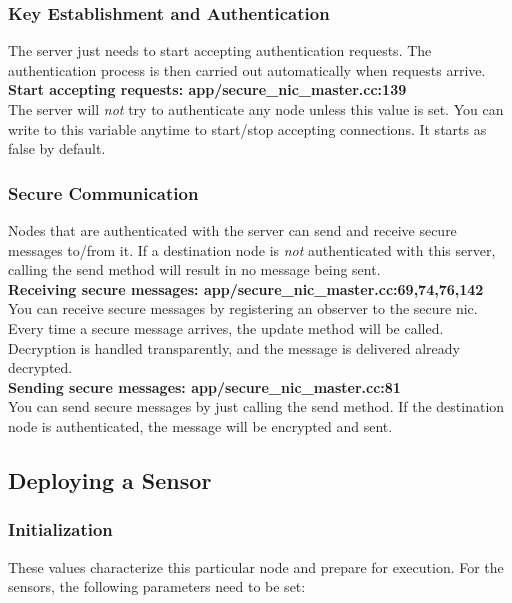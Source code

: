 \documentclass[a4paper,10pt]{article}   %
\begin{document}
	\subsubsection{Key Establishment and Authentication}
	The server just needs to start accepting authentication requests. The authentication process is then carried out automatically when requests arrive.\\

		\textbf{Start accepting requests: app/secure\_nic\_master.cc:139}\\
		\indent The server will \emph{not} try to authenticate any node unless this value is set. You can write to this variable anytime to start/stop accepting connections. It starts as false by default.\\

	\subsubsection{Secure Communication}
	Nodes that are authenticated with the server can send and receive secure messages to/from it. If a destination node is \emph{not} authenticated with this server, calling the send method will result in no message being sent.\\

		\textbf{Receiving secure messages: app/secure\_nic\_master.cc:69,74,76,142}\\
		\indent You can receive secure messages by registering an observer to the secure nic. Every time a secure message arrives, the update method will be called. Decryption is handled transparently, and the message is delivered already decrypted.\\

		\textbf{Sending secure messages: app/secure\_nic\_master.cc:81}\\
		\indent You can send secure messages by just calling the send method. If the destination node is authenticated, the message will be encrypted and sent.\\

	\subsection{Deploying a Sensor}
	\subsubsection{Initialization}
		These values characterize this particular node and prepare for execution. For the sensors, the following parameters need to be set:\\
\end{document}
